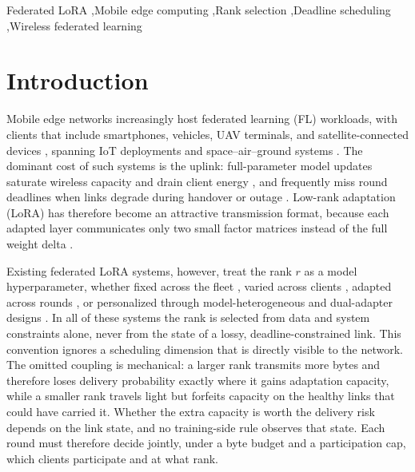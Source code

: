 \documentclass[a4paper,fleqn]{cas-dc}
\begin{document}
\begin{keywords}
Federated LoRA \sep Mobile edge computing \sep Rank selection \sep Deadline scheduling \sep Wireless federated learning
\end{keywords}
\maketitle

\section{Introduction}
\label{sec:intro}

Mobile edge networks increasingly host federated learning (FL) workloads, with clients that include smartphones, vehicles, UAV terminals, and satellite-connected devices \cite{mcmahan2017fedavg,kairouz2021advances}, spanning IoT deployments \cite{nguyen2021iotfl} and space--air--ground systems \cite{liu2018sagin,mahboob2024ntn}. The dominant cost of such systems is the uplink: full-parameter model updates saturate wireless capacity and drain client energy \cite{hamdi2022ehfl}, and frequently miss round deadlines when links degrade during handover or outage \cite{razmi2022ground,tang2023flsagin,qin2024dfrl,ribero2023intermittent}. Low-rank adaptation (LoRA) has therefore become an attractive transmission format, because each adapted layer communicates only two small factor matrices instead of the full weight delta \cite{hu2022lora,babakniya2023slora,zhang2024fedit}.

Existing federated LoRA systems, however, treat the rank $r$ as a model hyperparameter, whether fixed across the fleet \cite{sun2024ffalora,zhang2023fedpetuning}, varied across clients \cite{cho2024hetlora,fan2025helora}, adapted across rounds \cite{wu2026fedara,yang2024safedlora}, or personalized through model-heterogeneous and dual-adapter designs \cite{yi2026pfedlora,yang2024feddpa}. In all of these systems the rank is selected from data and system constraints alone, never from the state of a lossy, deadline-constrained link. This convention ignores a scheduling dimension that is directly visible to the network. The omitted coupling is mechanical: a larger rank transmits more bytes and therefore loses delivery probability exactly where it gains adaptation capacity, while a smaller rank travels light but forfeits capacity on the healthy links that could have carried it. Whether the extra capacity is worth the delivery risk depends on the link state, and no training-side rule observes that state. Each round must therefore decide jointly, under a byte budget and a participation cap, which clients participate and at what rank.
\end{document}
